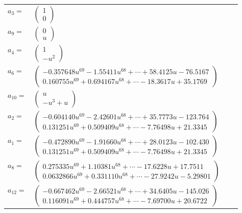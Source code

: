 \documentclass[1p]{elsarticle_modified}
\theoremstyle{definition}
\begin{document}
\begin{tabular}{m{7pt} m{180pt} m{7pt} m{180pt} }
\flushright $a_{3}=$&$\begin{pmatrix}1\\0\end{pmatrix}$ \\
\flushright $a_{9}=$&$\begin{pmatrix}0\\u\end{pmatrix}$ \\
\flushright $a_{4}=$&$\begin{pmatrix}1\\- u^2\end{pmatrix}$ \\
\flushright $a_{6}=$&$\begin{pmatrix}-0.357648 u^{69}-1.55411 u^{68}+\cdots+58.4125 u-76.5167\\0.160755 u^{69}+0.694167 u^{68}+\cdots-18.3617 u+35.1769\end{pmatrix}$ \\
\flushright $a_{10}=$&$\begin{pmatrix}u\\- u^3+u\end{pmatrix}$ \\
\flushright $a_{2}=$&$\begin{pmatrix}-0.604140 u^{69}-2.42601 u^{68}+\cdots+35.7773 u-123.764\\0.131251 u^{69}+0.509409 u^{68}+\cdots-7.76498 u+21.3345\end{pmatrix}$ \\
\flushright $a_{1}=$&$\begin{pmatrix}-0.472890 u^{69}-1.91660 u^{68}+\cdots+28.0123 u-102.430\\0.131251 u^{69}+0.509409 u^{68}+\cdots-7.76498 u+21.3345\end{pmatrix}$ \\
\flushright $a_{8}=$&$\begin{pmatrix}0.275335 u^{69}+1.10381 u^{68}+\cdots-17.6228 u+17.7511\\0.0632866 u^{69}+0.331110 u^{68}+\cdots-27.9242 u-5.29801\end{pmatrix}$ \\
\flushright $a_{12}=$&$\begin{pmatrix}-0.667462 u^{69}-2.66521 u^{68}+\cdots+34.6405 u-145.026\\0.116091 u^{69}+0.444757 u^{68}+\cdots-7.69700 u+20.6722\end{pmatrix}$ \\

\end{tabular}
\end{document}
